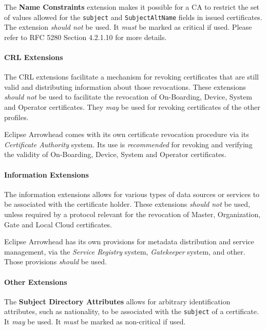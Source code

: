 The \textbf{Name Constraints} extension makes it possible for a CA to restrict the set of values allowed for the \texttt{subject} and \texttt{SubjectAltName} fields in issued certificates.
The extension \textit{should not} be used.
It \textit{must} be marked as critical if used.
Please refer to RFC 5280 Section 4.2.1.10 for more details.

\paragraph{CRL Extensions}

The CRL extensions facilitate a mechanism for revoking certificates that are still valid and distributing information about those revocations.
These extensions \textit{should not} be used to facilitate the revocation of On-Boarding, Device, System and Operator certificates.
They \textit{may} be used for revoking certificates of the other profiles.

Eclipse Arrowhead comes with its own certificate revocation procedure via its \textit{Certificate Authority} system.
Its use is \textit{recommended} for revoking and verifying the validity of On-Boarding, Device, System and Operator certificates.

\paragraph{Information Extensions}

The information extensions allows for various types of data sources or services to be associated with the certificate holder.
These extensions \textit{should not} be used, unless required by a protocol relevant for the revocation of Master, Organization, Gate and Local Cloud certificates.

Eclipse Arrowhead has its own provisions for metadata distribution and service management, via the \textit{Service Registry} system, \textit{Gatekeeper} system, and other.
Those provisions \textit{should} be used.

\paragraph{Other Extensions}

The \textbf{Subject Directory Attributes} allows for arbitrary identification attributes, such as nationality, to be associated with the \texttt{subject} of a certificate.
It \textit{may} be used.
It \textit{must} be marked as non-critical if used.


